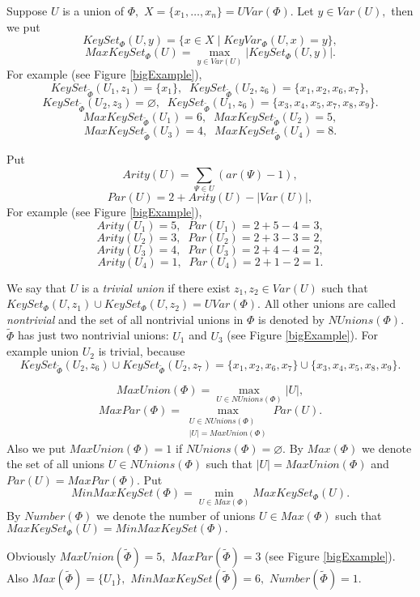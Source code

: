 \documentclass{au}
\theoremstyle{plain}
\theoremstyle{definition}
\theoremstyle{remark}
\numberwithin{equation}{section}
\begin{document}
Suppose $U$ is a union of $\Phi,$
$X = \{x_{1},\ldots,x_{n}\} = UVar(\Phi).$
Let $y\in Var(U),$ then
we put
$$KeySet_{\Phi}(U,y) = \{x \in X\;|\; KeyVar_{\Phi}(U,x) = y\},$$
$$MaxKeySet_{\Phi}(U) = \max \limits _{y\in Var(U)} |KeySet_{\Phi}(U,y)|.$$
For example (see Figure \ref{bigExample}),
$$KeySet_{\widetilde \Phi}(U_{1},z_{1}) = \{x_{1}\}, \;\;
KeySet_{\widetilde \Phi}(U_{2},z_{6}) = \{x_{1},x_{2},x_{6},x_{7}\},$$
$$KeySet_{\widetilde \Phi}(U_{2},z_{3}) = \varnothing, \;\;
KeySet_{\widetilde \Phi}(U_{1},z_{6}) = \{x_{3},x_{4},x_{5},x_{7},x_{8},x_{9}\}.$$
$$MaxKeySet_{\widetilde \Phi}(U_{1}) = 6, \;\;
MaxKeySet_{\widetilde \Phi}(U_{2}) = 5,$$
$$MaxKeySet_{\widetilde \Phi}(U_{3}) = 4, \;\;
MaxKeySet_{\widetilde \Phi}(U_{4}) = 8.$$

Put
$$Arity(U) = \sum\limits_{\Psi\in U} (ar(\Psi)-1),$$
$$Par(U) = 2+ Arity(U) - |Var(U)|,$$
For example (see Figure \ref{bigExample}),
$$Arity(U_{1}) = 5, \;\; Par(U_{1}) = 2+5 -4 = 3,$$
$$Arity(U_{2}) = 3, \;\; Par(U_{2}) = 2+3 -3 = 2,$$
$$Arity(U_{3}) = 4, \;\; Par(U_{3}) = 2+4 -4 = 2,$$
$$Arity(U_{4}) = 1, \;\; Par(U_{4}) = 2+1 -2 = 1.$$

We say that $U$ is a \emph{trivial union} if there exist $z_{1},z_{2}\in Var(U)$   
such that $KeySet_{\Phi}(U,z_{1})\cup KeySet_{\Phi}(U,z_{2}) = UVar(\Phi).$
All other unions are called \emph{nontrivial} and the set of all nontrivial unions in $\Phi$ is denoted by
$NUnions(\Phi).$
$\widetilde \Phi$ has just two nontrivial unions: $U_{1}$ and $U_{3}$ (see Figure \ref{bigExample}).
For example union $U_{2}$ is trivial, because
$$KeySet_{\widetilde \Phi}(U_{2},z_{6})\cup
KeySet_{\widetilde \Phi}(U_{2},z_{7})  =
\{x_{1},x_{2},x_{6},x_{7}\}\cup
\{x_{3},x_{4},x_{5},x_{8},x_{9}\}.$$ 

$$MaxUnion(\Phi) = \max\limits_{U\in NUnions(\Phi)} |U|,$$
$$MaxPar(\Phi) = \max\limits_{\substack{U\in NUnions(\Phi)\\ |U| = MaxUnion(\Phi)}} Par(U).$$
Also we put $MaxUnion(\Phi)=1$ if $NUnions(\Phi)=\varnothing.$
By $Max(\Phi)$ we denote the set of all
unions $U\in NUnions(\Phi)$
such that $|U|=MaxUnion(\Phi)$ and
$Par(U)=MaxPar(\Phi).$ Put
$$MinMaxKeySet(\Phi) = \min\limits_{U\in Max(\Phi)} MaxKeySet_{\Phi}(U).$$
By $Number(\Phi)$ we denote the number of unions $U\in Max(\Phi)$
such that 
$MaxKeySet_{\Phi}(U) = MinMaxKeySet(\Phi).$

Obviously $MaxUnion(\widetilde \Phi) = 5,$ $MaxPar(\widetilde \Phi) = 3$ (see Figure \ref{bigExample}).
Also $Max(\widetilde \Phi)=\{U_{1}\},$
$MinMaxKeySet(\widetilde \Phi) = 6,$
$Number(\widetilde \Phi) = 1.$
\end{document}
